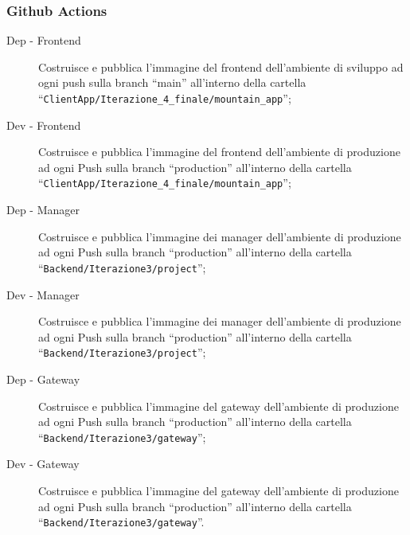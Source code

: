 \subsubsection{Github Actions}
\begin{description}
  \item[Dep - Frontend] Costruisce e pubblica l'immagine del frontend dell'ambiente di sviluppo ad ogni push sulla branch ``main'' all'interno della cartella\\``\verb|ClientApp/Iterazione_4_finale/mountain_app|'';
  \item[Dev - Frontend] Costruisce e pubblica l'immagine del frontend dell'ambiente di produzione ad ogni Push sulla branch ``production'' all'interno della cartella\\``\verb|ClientApp/Iterazione_4_finale/mountain_app|'';
  \item[Dep - Manager] Costruisce e pubblica l'immagine dei manager dell'ambiente di produzione ad ogni Push sulla branch ``production'' all'interno della cartella\\``\verb|Backend/Iterazione3/project|'';
  \item[Dev - Manager] Costruisce e pubblica l'immagine dei manager dell'ambiente di produzione ad ogni Push sulla branch ``production'' all'interno della cartella\\``\verb|Backend/Iterazione3/project|'';
  \item[Dep - Gateway] Costruisce e pubblica l'immagine del gateway dell'ambiente di produzione ad ogni Push sulla branch ``production'' all'interno della cartella\\``\verb|Backend/Iterazione3/gateway|'';
  \item[Dev - Gateway] Costruisce e pubblica l'immagine del gateway dell'ambiente di produzione ad ogni Push sulla branch ``production'' all'interno della cartella\\``\verb|Backend/Iterazione3/gateway|''.
\label{tab: github-actions-finali}
\end{description}
\newpage
